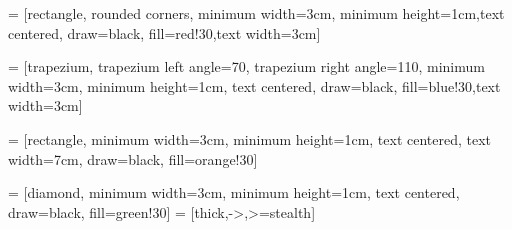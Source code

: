 
 = [rectangle, rounded corners, minimum width=3cm, minimum height=1cm,text centered, draw=black, fill=red!30,text width=3cm]

 = [trapezium, trapezium left angle=70, trapezium right angle=110, minimum width=3cm, minimum height=1cm, text centered, draw=black, fill=blue!30,text width=3cm]

 = [rectangle, minimum width=3cm, minimum height=1cm, text centered, text width=7cm, draw=black, fill=orange!30]

 = [diamond, minimum width=3cm, minimum height=1cm, text centered, draw=black, fill=green!30]
 = [thick,->,>=stealth]

